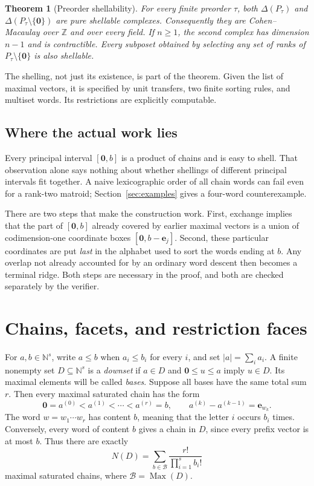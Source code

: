 \documentclass[11pt]{article}
\numberwithin{equation}{section}
\newtheorem{theorem}{Theorem}[section]
\theoremstyle{definition}
\theoremstyle{remark}
\newcommand{\N}{\mathbb N}
\newcommand{\Z}{\mathbb Z}
\newcommand{\ee}{\mathbf e}
\newcommand{\zero}{\mathbf 0}
\newcommand{\B}{\mathcal B}
\newcommand{\Max}{\operatorname{Max}}
\begin{document}
\begin{theorem}[Preorder shellability]
\label{thm:main}
For every finite preorder $\tau$, both $\Delta(P_\tau)$ and
$\Delta(P_\tau\setminus\{\zero\})$ are pure shellable complexes. Consequently
they are Cohen--Macaulay over $\Z$ and over every field. If $n\ge1$, the second
complex has dimension $n-1$ and is contractible. Every subposet obtained by
selecting any set of ranks of $P_\tau\setminus\{\zero\}$ is also shellable.
\end{theorem}

The shelling, not just its existence, is part of the theorem. Given the list
of maximal vectors, it is specified by unit transfers, two finite sorting
rules, and multiset words. Its restrictions are explicitly computable.

\subsection{Where the actual work lies}

Every principal interval $[\zero,b]$ is a product of chains and is easy to
shell. That observation alone says nothing about whether shellings of
different principal intervals fit together. A naive lexicographic order of
all chain words can fail even for a rank-two matroid; Section~\ref{sec:examples}
gives a four-word counterexample.

There are two steps that make the construction work. First, exchange implies
that the part of $[\zero,b]$ already covered by earlier maximal vectors is a
union of codimension-one coordinate boxes $[\zero,b-\ee_j]$. Second, these
particular coordinates are put \emph{last} in the alphabet used to sort the
words ending at $b$. Any overlap not already accounted for by an ordinary
word descent then becomes a terminal ridge. Both steps are necessary in the
proof, and both are checked separately by the verifier.

\section{Chains, facets, and restriction faces}
\label{sec:preliminaries}

For $a,b\in\N^s$, write $a\le b$ when $a_i\le b_i$ for every $i$, and set
$|a|=\sum_i a_i$. A finite nonempty set $D\subseteq\N^s$ is a
\emph{downset} if $a\in D$ and $\zero\le u\le a$ imply $u\in D$. Its maximal
elements will be called \emph{bases}. Suppose all bases have the same total
sum $r$. Then every maximal saturated chain has the form
\begin{equation}
 \zero=a^{(0)}<a^{(1)}<\cdots<a^{(r)}=b,
 \qquad a^{(k)}-a^{(k-1)}=\ee_{w_k}.
 \label{eq:chain-word}
\end{equation}
The word $w=w_1\cdots w_r$ has content $b$, meaning that the letter $i$
occurs $b_i$ times. Conversely, every word of content $b$ gives a chain in
$D$, since every prefix vector is at most $b$. Thus there are exactly
\begin{equation}
 N(D)=\sum_{b\in\B}\frac{r!}{\prod_{i=1}^s b_i!}
 \label{eq:facet-count}
\end{equation}
maximal saturated chains, where $\B=\Max(D)$.
\end{document}
